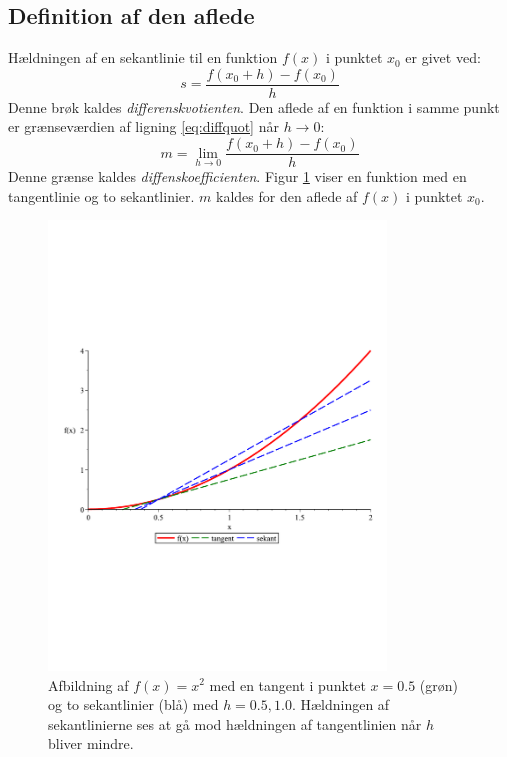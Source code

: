 \documentclass[a4paper, 11pt]{article}
\begin{document}
\subsection{Definition af den aflede}
Hældningen af en sekantlinie til en funktion $f(x)$ i punktet $x_0$ er givet ved:
\begin{equation} \label{eq:diffquot}
s = \frac{f(x_0+h) - f(x_0)}{h}
\end{equation}
Denne brøk kaldes \emph{differenskvotienten}. Den aflede af en funktion i samme punkt er grænseværdien af ligning \eqref{eq:diffquot} når $h\to0$:
\begin{equation} \label{eq:diffcoef}
m = \lim_{h\to0}\frac{f(x_0+h) - f(x_0)}{h}
\end{equation}
Denne grænse kaldes \emph{diffenskoefficienten}.  Figur \ref{fig:secanttangent} viser en funktion med en tangentlinie og to sekantlinier. $m$ kaldes for den aflede af $f(x)$ i punktet $x_0$. 
\begin{figure}[b]
	\centering
	\includegraphics[width=0.8\textwidth, clip, trim=0 7.8cm 0 6cm]{secant}
	\caption{Afbildning af $f(x)=x^2$ med en tangent i punktet $x=0.5$ (grøn) og to sekantlinier (blå) med $h=0.5, 1.0$. Hældningen af sekantlinierne ses at gå mod hældningen af tangentlinien når $h$ bliver mindre.}
	\label{fig:secanttangent}
\end{figure}
\end{document}

